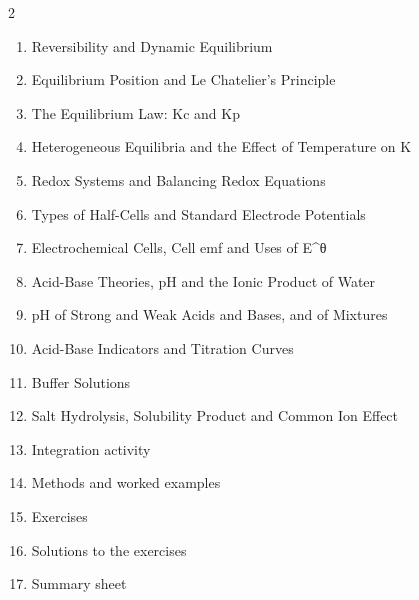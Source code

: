 \documentclass[11pt]{article}
\begin{document}
\begin{sommaire}
\begin{multicols}{2}
\begin{enumerate}
\item Reversibility and Dynamic Equilibrium
\item Equilibrium Position and Le Chatelier's Principle
\item The Equilibrium Law: Kc and Kp
\item Heterogeneous Equilibria and the Effect of Temperature on K
\item Redox Systems and Balancing Redox Equations
\item Types of Half-Cells and Standard Electrode Potentials
\item Electrochemical Cells, Cell emf and Uses of E\^{}θ
\item Acid-Base Theories, pH and the Ionic Product of Water
\item pH of Strong and Weak Acids and Bases, and of Mixtures
\item Acid-Base Indicators and Titration Curves
\item Buffer Solutions
\item Salt Hydrolysis, Solubility Product and Common Ion Effect
\item Integration activity
\item Methods and worked examples
\item Exercises
\item Solutions to the exercises
\item Summary sheet
\end{enumerate}
\end{multicols}
\end{sommaire}
\end{document}
